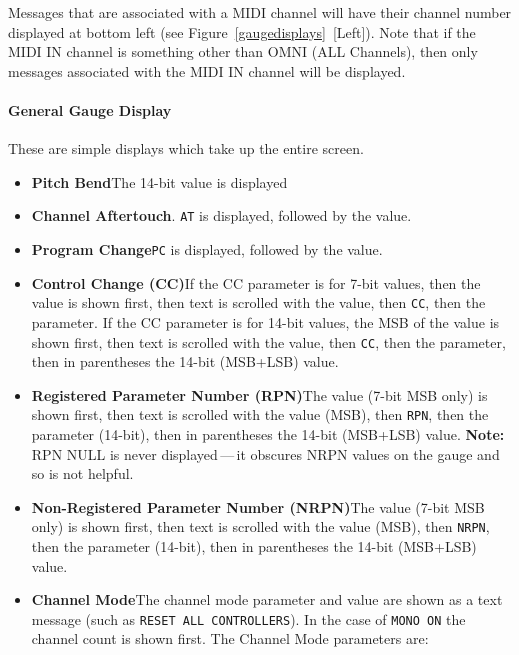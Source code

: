 \documentclass{article}
\begin{document}
Messages that are associated with a MIDI channel will have their channel number displayed at bottom left (see Figure~\ref{gaugedisplays}~[Left]).  Note that if the MIDI IN channel is something other than OMNI (ALL Channels), then only messages associated with the MIDI IN channel will be displayed.






\paragraph{General Gauge Display}  These are simple displays which take up the entire screen.

\begin{itemize}
\item {\bf Pitch Bend}\quad The 14-bit value is displayed
\item {\bf Channel Aftertouch}.  \texttt{AT} is displayed, followed by the value.
\item {\bf Program Change}\quad \texttt{PC} is displayed, followed by the value.
\item {\bf Control Change (CC)}\quad If the CC parameter is for 7-bit values, then the value is shown first, then text is scrolled with the value, then \texttt{CC}, then the parameter.  If the CC parameter is for 14-bit values, the MSB of the value is shown first, then text is scrolled with the value, then \texttt{CC}, then the parameter, then in parentheses the 14-bit (MSB+LSB) value.
\item {\bf Registered Parameter Number (RPN)}\quad The value (7-bit MSB only) is shown first, then text is scrolled with the value (MSB), then \texttt{RPN}, then the parameter (14-bit), then in parentheses the 14-bit (MSB+LSB) value.   {\bf Note:} RPN NULL is never displayed\,---\,it obscures NRPN values on the gauge and so is not helpful.
\item {\bf Non-Registered Parameter Number (NRPN)}\quad The value (7-bit MSB only) is shown first, then text is scrolled with the value (MSB), then \texttt{NRPN}, then the parameter (14-bit), then in parentheses the 14-bit (MSB+LSB) value.
\item {\bf Channel Mode}\quad The channel mode parameter and value are shown as a text message (such as \texttt{RESET ALL CONTROLLERS}).  In the case of \texttt{MONO ON} the channel count is shown first.  The Channel Mode parameters are:
\begin{center}\begin{tabular}{@{}rlll@{}}

\end{tabular}
\end{center}
\end{itemize}
\end{document}
